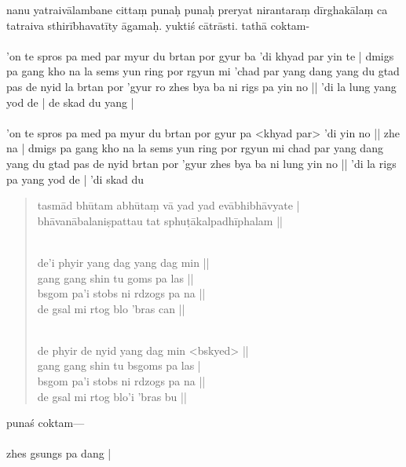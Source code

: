 \documentclass[12pt]{article}
\begin{document}
nanu yatraivālambane cittaṃ punaḥ punaḥ preryat nirantaraṃ\footnoteB{
	nirantaraṃ] \EDD\ (\emd) \TIB\ (rgyun mi 'chad par); niruttaraṃ \MS
} dīrghakālaṃ ca tatraiva sthirībhavatīty āgamaḥ. yuktiś cātrāsti. tathā coktam-\\

\textbf{\TVA}\\
'on te spros pa med par myur du brtan por gyur ba 'di khyad par yin te | dmigs pa gang kho na la sems yun ring por rgyun mi 'chad par yang dang yang du gtad pas de nyid la brtan por 'gyur ro zhes bya ba ni rigs pa yin no || 'di la lung yang yod de | de skad du yang |\\

\textbf{\TVB}\\
'on te spros pa med pa myur du brtan por gyur pa <khyad par> 'di yin no || zhe na | dmigs pa gang kho na la sems yun ring por rgyun mi chad par yang dang yang du gtad pas de nyid brtan por 'gyur zhes bya ba ni lung yin no || 'di la rigs pa yang yod de | 'di skad du 

\begin{quote}
	tasmād bhūtam abhūtaṃ vā yad yad evābhibhāvyate | \\
	bhāvanābalaniṣpattau tat sphuṭākalpadhīphalam\footnoteB{
		kalpadhīphalam] \emd ; kalpadhīḥ phalam \MS\ \EDD
	} ||

	\textbf{\TVA}\\
	de'i phyir yang dag yang dag min || \\
	gang gang shin tu goms pa las || \\
	bsgom pa'i stobs ni rdzogs pa na || \\
	de gsal mi rtog blo 'bras can || 

	\textbf{\TVB}\\
	de phyir de nyid yang dag min <bskyed> || \\
	gang gang shin tu bsgoms pa las | \\
	bsgom pa'i stobs ni rdzogs pa na || \\
	de gsal mi rtog blo'i 'bras bu || 
\end{quote}

punaś coktam—\\

\textbf{\TVA}\\
zhes gsungs pa dang |\\
\end{document}
